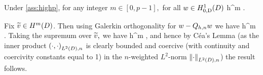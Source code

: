





\label{lem:wltdprojerr}
Under \cref{ass:highp}, for any integer $m \in [0,p-1],$ for all $w \in \HozDD$
\beq\label{eq:wltdprojerr}
 \leq {} \frac{\nmax}{\nmin} h^{m} .
\eeq
\ele

Fix $\vtilde \in \HmD$. Then using Galerkin orthogonality for $w - Q_{h,n} w$ we have
\beqs%
 \leq {}\NLtDn{\vtilde-\Ih\vtilde}\leq {} \frac{\nmax}{\nmin} h^m \NHmDn{\vtilde}.
\eeqs%
Taking the supremum over $\widetilde{v},$ we have
\beqs
{} \leq {} \frac{\nmax}{\nmin} h^m ,
\eeqs
and hence by C\'ea's Lemma (as the inner product $\IPLtDn{\cdot}{\cdot}$ is clearly bounded and coercive (with continuity and coercivity constants equal to 1) in the $n$-weighted $L^2$-norm $\NLtDn{\cdot}$) the result follows.
\epf


